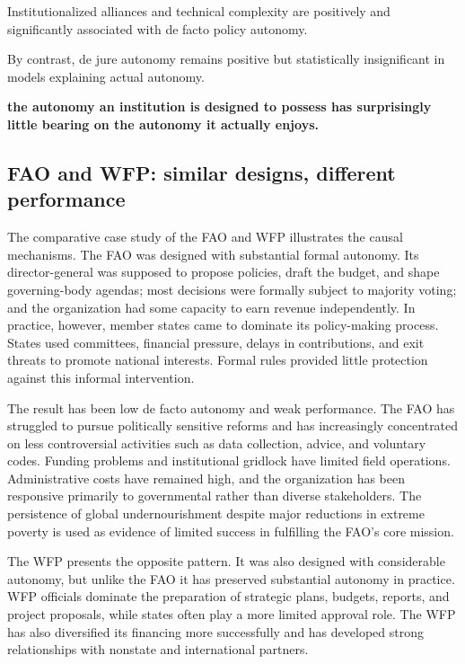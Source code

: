 Institutionalized alliances and technical complexity are positively and significantly associated with de facto policy autonomy.

By contrast, de jure autonomy remains positive but statistically insignificant in models explaining actual autonomy.

\textbf{the autonomy an institution is designed to possess has surprisingly little bearing on the autonomy it actually enjoys.}

\subsection{FAO and WFP: similar designs, different performance}

The comparative case study of the FAO and WFP illustrates the causal mechanisms. The FAO was designed with substantial formal autonomy. Its director-general was supposed to propose policies, draft the budget, and shape governing-body agendas; most decisions were formally subject to majority voting; and the organization had some capacity to earn revenue independently. In practice, however, member states came to dominate its policy-making process. States used committees, financial pressure, delays in contributions, and exit threats to promote national interests. Formal rules provided little protection against this informal intervention.

The result has been low de facto autonomy and weak performance. The FAO has struggled to pursue politically sensitive reforms and has increasingly concentrated on less controversial activities such as data collection, advice, and voluntary codes. Funding problems and institutional gridlock have limited field operations. Administrative costs have remained high, and the organization has been responsive primarily to governmental rather than diverse stakeholders. The persistence of global undernourishment despite major reductions in extreme poverty is used as evidence of limited success in fulfilling the FAO's core mission.

The WFP presents the opposite pattern. It was also designed with considerable autonomy, but unlike the FAO it has preserved substantial autonomy in practice. WFP officials dominate the preparation of strategic plans, budgets, reports, and project proposals, while states often play a more limited approval role. The WFP has also diversified its financing more successfully and has developed strong relationships with nonstate and international partners.

